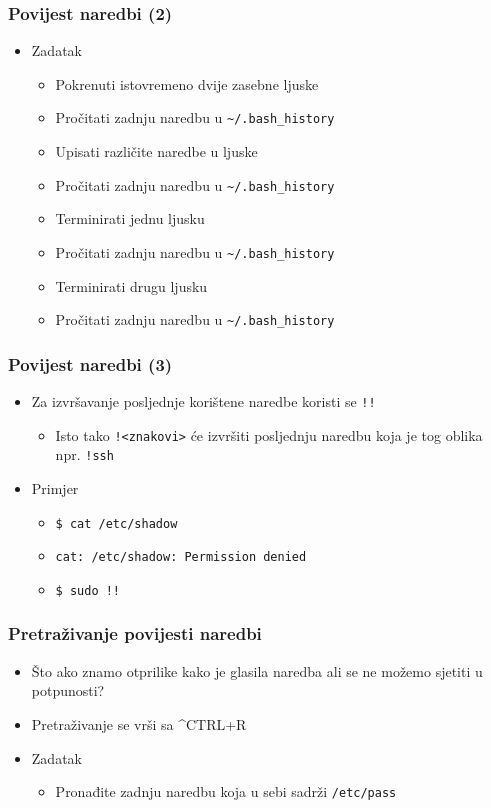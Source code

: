 \documentclass[table,usenames,dvipsnames]{beamer}
\newcommand{\shell}[1]{\texttt{#1}}
\begin{document}
\begin{frame}[t]
\frametitle{Povijest naredbi (2)}
\begin{itemize}
  \item Zadatak
  \begin{itemize}
    \item Pokrenuti istovremeno dvije zasebne ljuske
    \item Pročitati zadnju naredbu u \shell{\~{}/.bash\_history}
    \item Upisati različite naredbe u ljuske
    \item Pročitati zadnju naredbu u \shell{\~{}/.bash\_history}
    \item Terminirati jednu ljusku
    \item Pročitati zadnju naredbu u \shell{\~{}/.bash\_history}
    \item Terminirati drugu ljusku
    \item Pročitati zadnju naredbu u \shell{\~{}/.bash\_history}
  \end{itemize}
\end{itemize}
\end{frame}

\begin{frame}[t]
\frametitle{Povijest naredbi (3)}
\begin{itemize}
  \item Za izvršavanje posljednje korištene naredbe koristi se \shell{!!}
  \begin{itemize}
    \item Isto tako \shell{!<znakovi>} će izvršiti posljednju naredbu koja
          je tog oblika npr. \shell{!ssh}
  \end{itemize}
  \item Primjer
  \begin{itemize}
    \item[] \shell{\$ cat /etc/shadow}
    \item[] \shell{cat: /etc/shadow: Permission denied}
    \item[] \shell{\$ sudo !!}
  \end{itemize}
\end{itemize}
\end{frame}
      
\begin{frame}[t]
\frametitle{Pretraživanje povijesti naredbi}
\begin{itemize}
  \item Što ako znamo otprilike kako je glasila naredba ali se ne možemo 
        sjetiti u potpunosti?
  \item Pretraživanje se vrši sa \textasciicircum{}CTRL+R
  \item Zadatak
  \begin{itemize}
    \item Pronađite zadnju naredbu koja u sebi sadrži \shell{/etc/pass}
  \end{itemize}
\end{itemize}
\end{frame}
\end{document}
